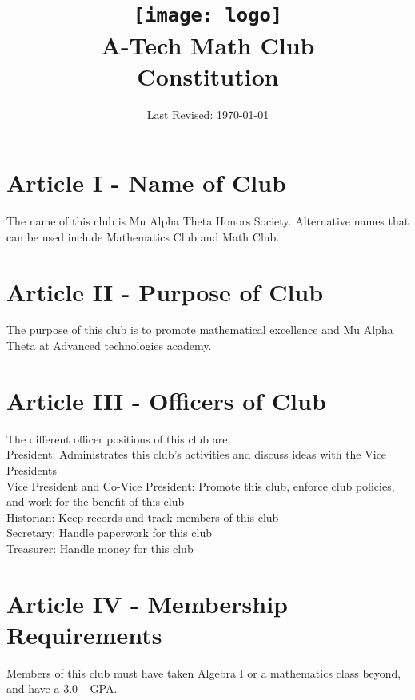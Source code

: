 \documentclass[a4, 12p]{article}
\begin{document}
\title{\texttt{[image: logo]}\\
A-Tech Math Club\\
  Constitution}
\date{Last Revised: \today}

\maketitle

\section*{Article I - Name of Club}
The name of this club is Mu Alpha Theta Honors Society. Alternative names that can be used include Mathematics Club and Math Club.

\section*{Article II - Purpose of Club}
The purpose of this club is to promote mathematical excellence and Mu Alpha Theta at Advanced technologies academy.

\newpage

\section*{Article III - Officers of Club}
The different officer positions of this club are:\\

President: Administrates this club's activities and discuss ideas with the Vice Presidents\\

Vice President and Co-Vice President: Promote this club, enforce club policies, and work for the benefit of this club\\

Historian: Keep records and track members of this club\\

Secretary: Handle paperwork for this club\\

Treasurer: Handle money for this club\\

\section*{Article IV - Membership Requirements}
Members of this club must have taken Algebra I or a mathematics class beyond, and have a 3.0+ GPA.
\end{document}
